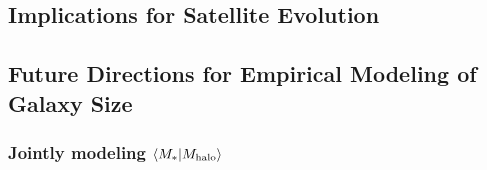 \documentclass[usenatbib,usegraphicx,letterpaper]{mn2e}
\newcommand{\rhalf}{R_{1/2}}
\newcommand{\mstar}{M_{\ast}}
\newcommand{\mhalo}{M_{\rm halo}}
\newcommand{\rvir}{R_{\rm vir}}
\begin{document}
\subsection{Implications for Satellite Evolution}
\label{subsec:satellite_discussion}



\subsection{Future Directions for Empirical Modeling of Galaxy Size}
\label{subsec:future}

\subsubsection{Jointly modeling $\langle\mstar\vert\mhalo\rangle$}
\end{document}
